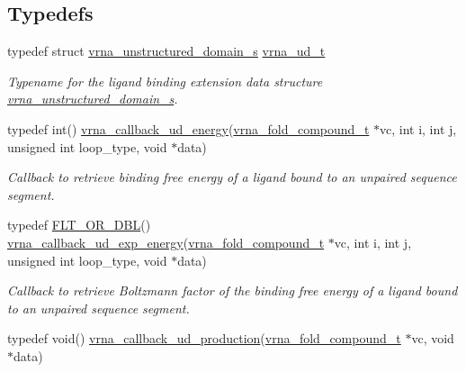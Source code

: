 \subsection*{Typedefs}
\begin{DoxyCompactItemize}
\item 
\mbox{\label{group__domains__up_ga0009117b14d29143e8b18ab891f48c2d}} 
typedef struct \hyperlink{group__domains__up_structvrna__unstructured__domain__s}{vrna\+\_\+unstructured\+\_\+domain\+\_\+s} \hyperlink{group__domains__up_ga0009117b14d29143e8b18ab891f48c2d}{vrna\+\_\+ud\+\_\+t}
\begin{DoxyCompactList}\small\item\em Typename for the ligand binding extension data structure \hyperlink{group__domains__up_structvrna__unstructured__domain__s}{vrna\+\_\+unstructured\+\_\+domain\+\_\+s}. \end{DoxyCompactList}\item 
typedef int() \hyperlink{group__domains__up_ga75825c57d0bfde4ae4f95c044260c5c3}{vrna\+\_\+callback\+\_\+ud\+\_\+energy}(\hyperlink{group__fold__compound_ga1b0cef17fd40466cef5968eaeeff6166}{vrna\+\_\+fold\+\_\+compound\+\_\+t} $\ast$vc, int i, int j, unsigned int loop\+\_\+type, void $\ast$data)
\begin{DoxyCompactList}\small\item\em Callback to retrieve binding free energy of a ligand bound to an unpaired sequence segment. \end{DoxyCompactList}\item 
typedef \hyperlink{group__data__structures_ga31125aeace516926bf7f251f759b6126}{F\+L\+T\+\_\+\+O\+R\+\_\+\+D\+BL}() \hyperlink{group__domains__up_ga861706f257ba993753464b823e65b86e}{vrna\+\_\+callback\+\_\+ud\+\_\+exp\+\_\+energy}(\hyperlink{group__fold__compound_ga1b0cef17fd40466cef5968eaeeff6166}{vrna\+\_\+fold\+\_\+compound\+\_\+t} $\ast$vc, int i, int j, unsigned int loop\+\_\+type, void $\ast$data)
\begin{DoxyCompactList}\small\item\em Callback to retrieve Boltzmann factor of the binding free energy of a ligand bound to an unpaired sequence segment. \end{DoxyCompactList}\item 
typedef void() \hyperlink{group__domains__up_ga4fdfc02c1b660c07f2d887772f02a0a1}{vrna\+\_\+callback\+\_\+ud\+\_\+production}(\hyperlink{group__fold__compound_ga1b0cef17fd40466cef5968eaeeff6166}{vrna\+\_\+fold\+\_\+compound\+\_\+t} $\ast$vc, void $\ast$data)

\end{DoxyCompactItemize}
